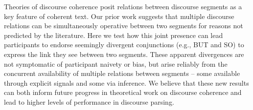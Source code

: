 Theories of discourse coherence posit relations between discourse segments as a key feature of coherent text. Our prior work suggests that multiple discourse relations can be simultaneously operative between two segments for reasons not predicted by the literature. Here we test how this joint presence can lead participants to endorse seemingly divergent conjunctions (e.g., BUT and SO) to express the link they see between two segments. These apparent divergences are not symptomatic of participant naivety or bias, but arise reliably from the concurrent availability of multiple relations between segments -- some available through explicit signals and some via inference. We believe that these new results can both inform future progress in theoretical work on discourse coherence and lead to higher levels of performance in discourse parsing.
